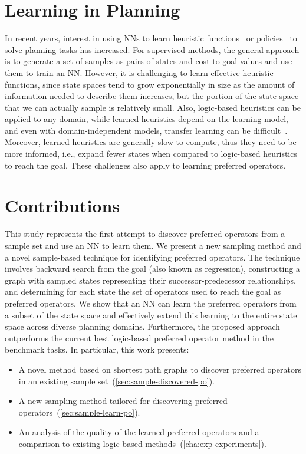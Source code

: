 \documentclass[ppgc,diss,english]{iiufrgs}
\begin{document}
\section{Learning in Planning}
\label{sec:intro-learning-planning}
In recent years, interest in using NNs to learn heuristic functions~\cite{Ferber.etal/2020a,Yu.etal/2020,Shen.etal/2020,Ferber.etal/2022,OToole/2022} or policies~\cite{Toyer.etal/2018,Toyer.etal/2020,Stahlberg.etal/2022} to solve planning tasks has increased. For supervised methods, the general approach is to generate a set of samples as pairs of states and cost-to-goal values and use them to train an NN. However, it is challenging to learn effective heuristic functions, since state spaces tend to grow exponentially in size as the amount of information needed to describe them increases, but the portion of the state space that we can actually sample is relatively small. Also, logic-based heuristics can be applied to any domain, while learned heuristics depend on the learning model, and even with domain-independent models, transfer learning can be difficult~\cite{Shen.etal/2020}. Moreover, learned heuristics are generally slow to compute, thus they need to be more informed, i.e., expand fewer states when compared to logic-based heuristics to reach the goal. These challenges also apply to learning preferred operators.

\section{Contributions}
\label{sec:intro-contributions}
This study represents the first attempt to discover preferred operators from a sample set and use an NN to learn them. We present a new sampling method and a novel sample-based technique for identifying preferred operators. The technique involves backward search from the goal (also known as regression), constructing a graph with sampled states representing their successor-predecessor relationships, and determining for each state the set of operators used to reach the goal as preferred operators. We show that an NN can learn the preferred operators from a subset of the state space and effectively extend this learning to the entire state space across diverse planning domains. Furthermore, the proposed approach outperforms the current best logic-based preferred operator method in the benchmark tasks. In particular, this work presents:

\begin{itemize}
\item A novel method based on shortest path graphs to discover preferred operators in an existing sample set~(\cref{sec:sample-discovered-po}).
\item A new sampling method tailored for discovering preferred operators~(\cref{sec:sample-learn-po}).
\item An analysis of the quality of the learned preferred operators and a comparison to existing logic-based methods~(\cref{cha:exp-experiments}).
\end{itemize}
%
%
\end{document}
